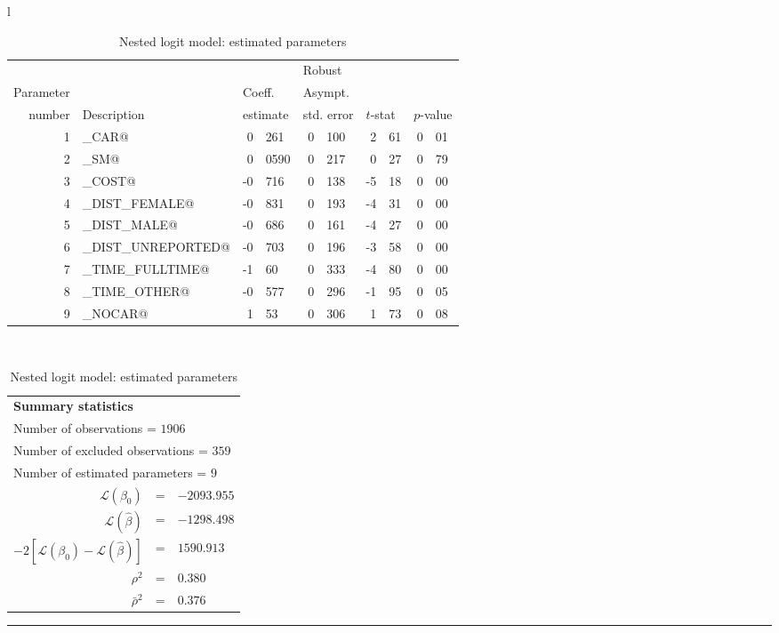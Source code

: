 \documentclass[12pt,a4paper]{article}
\newcommand{\tablefootnote}[1]{\begin{flushright}
\rule{5cm}{1pt}\\
\protect\footnotemark[1]{\footnotesize #1}
\end{flushright}
}
\begin{document}
\begin{table}
  \begin{tabular}{l}
\begin{tabular}{rlr@{.}lr@{.}lr@{.}lr@{.}l}
         &                       &   \multicolumn{2}{l}{}    & \multicolumn{2}{l}{Robust}  &     \multicolumn{4}{l}{}   \\
Parameter &                       &   \multicolumn{2}{l}{Coeff.}      & \multicolumn{2}{l}{Asympt.}  &     \multicolumn{4}{l}{}   \\
number &  Description                     &   \multicolumn{2}{l}{estimate}      & \multicolumn{2}{l}{std. error}  &   \multicolumn{2}{l}{$t$-stat}  &   \multicolumn{2}{l}{$p$-value}   \\

\hline

1 & \lstinline@ASC_CAR@ & 0&261 & 0&100 & 2&61 & 0&01\\
2 & \lstinline@ASC_SM@ & 0&0590 & 0&217 & 0&27 & 0&79\\
3 & \lstinline@BETA_COST@ & -0&716 & 0&138 & -5&18 & 0&00\\
4 & \lstinline@BETA_DIST_FEMALE@ & -0&831 & 0&193 & -4&31 & 0&00\\
5 & \lstinline@BETA_DIST_MALE@ & -0&686 & 0&161 & -4&27 & 0&00\\
6 & \lstinline@BETA_DIST_UNREPORTED@ & -0&703 & 0&196 & -3&58 & 0&00\\
7 & \lstinline@BETA_TIME_FULLTIME@ & -1&60 & 0&333 & -4&80 & 0&00\\
8 & \lstinline@BETA_TIME_OTHER@ & -0&577 & 0&296 & -1&95 & 0&05\\
9 & \lstinline@NEST_NOCAR@ & 1&53 & 0&306 & 1&73\footnotemark[1] & 0&08\\

\hline
\end{tabular}
\\
\begin{tabular}{rcl}
\multicolumn{3}{l}{\bf Summary statistics}\\
\multicolumn{3}{l}{ Number of observations = $1906$} \\
\multicolumn{3}{l}{ Number of excluded observations = $359$} \\
\multicolumn{3}{l}{ Number of estimated  parameters = $9$} \\
 $\mathcal{L}(\beta_0)$ &=&  $-2093.955$ \\
 $\mathcal{L}(\hat{\beta})$ &=& $-1298.498 $  \\
 $-2[\mathcal{L}(\beta_0) -\mathcal{L}(\hat{\beta})]$ &=& $1590.913$ \\
    $\rho^2$ &=&   $0.380$ \\
    $\bar{\rho}^2$ &=&    $0.376$ \\
\end{tabular}
  \end{tabular}
\tablefootnote{$t$-test against 1} 
\caption{\protect\label{tab:estimatedParameters}Nested logit model: estimated parameters}
\end{table}
\end{document}
